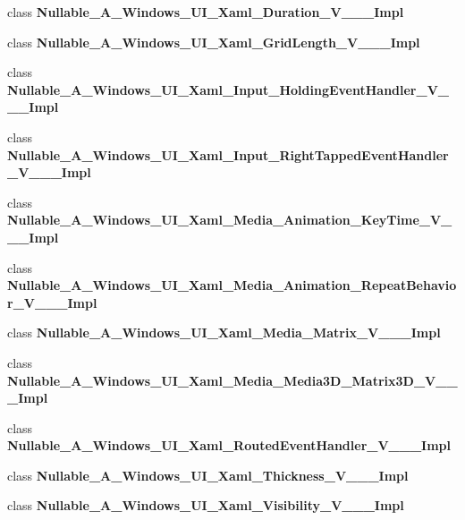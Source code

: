 \begin{DoxyCompactItemize}
\item 
class {\bfseries Nullable\+\_\+\+A\+\_\+\+Windows\+\_\+\+U\+I\+\_\+\+Xaml\+\_\+\+Duration\+\_\+\+V\+\_\+\+\_\+\+\_\+\+Impl}
\item 
class {\bfseries Nullable\+\_\+\+A\+\_\+\+Windows\+\_\+\+U\+I\+\_\+\+Xaml\+\_\+\+Grid\+Length\+\_\+\+V\+\_\+\+\_\+\+\_\+\+Impl}
\item 
class {\bfseries Nullable\+\_\+\+A\+\_\+\+Windows\+\_\+\+U\+I\+\_\+\+Xaml\+\_\+\+Input\+\_\+\+Holding\+Event\+Handler\+\_\+\+V\+\_\+\+\_\+\+\_\+\+Impl}
\item 
class {\bfseries Nullable\+\_\+\+A\+\_\+\+Windows\+\_\+\+U\+I\+\_\+\+Xaml\+\_\+\+Input\+\_\+\+Right\+Tapped\+Event\+Handler\+\_\+\+V\+\_\+\+\_\+\+\_\+\+Impl}
\item 
class {\bfseries Nullable\+\_\+\+A\+\_\+\+Windows\+\_\+\+U\+I\+\_\+\+Xaml\+\_\+\+Media\+\_\+\+Animation\+\_\+\+Key\+Time\+\_\+\+V\+\_\+\+\_\+\+\_\+\+Impl}
\item 
class {\bfseries Nullable\+\_\+\+A\+\_\+\+Windows\+\_\+\+U\+I\+\_\+\+Xaml\+\_\+\+Media\+\_\+\+Animation\+\_\+\+Repeat\+Behavior\+\_\+\+V\+\_\+\+\_\+\+\_\+\+Impl}
\item 
class {\bfseries Nullable\+\_\+\+A\+\_\+\+Windows\+\_\+\+U\+I\+\_\+\+Xaml\+\_\+\+Media\+\_\+\+Matrix\+\_\+\+V\+\_\+\+\_\+\+\_\+\+Impl}
\item 
class {\bfseries Nullable\+\_\+\+A\+\_\+\+Windows\+\_\+\+U\+I\+\_\+\+Xaml\+\_\+\+Media\+\_\+\+Media3\+D\+\_\+\+Matrix3\+D\+\_\+\+V\+\_\+\+\_\+\+\_\+\+Impl}
\item 
class {\bfseries Nullable\+\_\+\+A\+\_\+\+Windows\+\_\+\+U\+I\+\_\+\+Xaml\+\_\+\+Routed\+Event\+Handler\+\_\+\+V\+\_\+\+\_\+\+\_\+\+Impl}
\item 
class {\bfseries Nullable\+\_\+\+A\+\_\+\+Windows\+\_\+\+U\+I\+\_\+\+Xaml\+\_\+\+Thickness\+\_\+\+V\+\_\+\+\_\+\+\_\+\+Impl}
\item 
class {\bfseries Nullable\+\_\+\+A\+\_\+\+Windows\+\_\+\+U\+I\+\_\+\+Xaml\+\_\+\+Visibility\+\_\+\+V\+\_\+\+\_\+\+\_\+\+Impl}
\end{DoxyCompactItemize}
